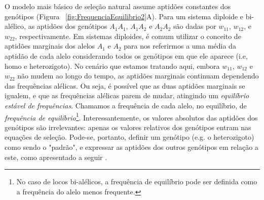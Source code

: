 \begin{refsection}
	\label{sub:PressaoSeletivaConstante}O modelo mais básico de seleção natural assume aptidões constantes dos genótipos (Figura ~\ref{fig:FrequenciaEquilibrio2}A). Para um sistema diploide e bi-alélico, as aptidões dos genótipos $A_{1}A_{1}$, $A_{1}A_{2}$ e $A_{2}A_{2}$ são dadas por $w_{11}$, $w_{12}$, e $w_{22}$, respectivamente. Em sistemas diploides, é comum utilizar o conceito de aptidões marginais dos alelos $A_{1}$ e $A_{2}$ para nos referirmos a uma média da aptidão de cada alelo considerando todos os genótipos em que ele aparece (i.e, homo e heterozigoto). 
    No cenário que estamos tratando aqui, embora $w_{11}$, $w_{12}$ e $w_{22}$ não mudem ao longo do tempo, as aptidões marginais continuam dependendo das frequências alélicas. Ou seja, é possível que as duas aptidões marginais se igualem, e que as frequências alélicas parem de mudar, atingindo um \emph{equilíbrio estável de frequências}. Chamamos a frequência de cada alelo, no equilíbrio, de \emph{frequência de equilíbrio}\footnote{No caso de locos bi-alélicos, a frequência de equilíbrio pode ser definida como a frequência do alelo menos frequente.}.  Interessantemente, os valores absolutos das aptidões dos genótipos são irrelevantes: apenas os valores relativos dos genótipos entram nas equações de seleção. Pode-se, portanto, definir um genótipo (e.g. o heterozigoto) como sendo o "padrão", e expressar as aptidões dos outros genótipos em relação a este, como apresentado a seguir \parencite{Charlesworth2010}.


\end{refsection}
